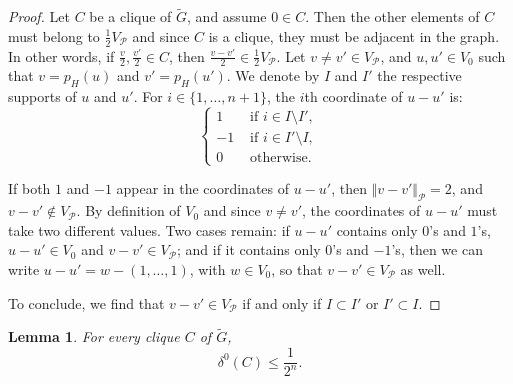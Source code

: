 \documentclass{amsart}                     %
\newtheorem{lemm}{Lemma}
\begin{document}
\begin{proof}
Let $C$ be a clique of $\tilde{G}$, and assume $0\in C$. Then the other elements of $C$ must belong to $\frac{1}{2}V_\mathcal{P}$ and since $C$ is a clique, they must be adjacent in the graph. In other words, if $\frac{v}{2},\frac{v'}{2}\in C$, then $\frac{v-v'}{2}\in \frac{1}{2}V_\mathcal{P}$. Let $v\neq v'\in V_\mathcal{P}$, and $u,u'\in V_0$ such that $v=p_H(u)$ and $v'=p_H(u')$. We denote by $I$ and $I'$ the respective supports of $u$ and $u'$. For $i\in\{1,\ldots,n+1\}$, the $i$th coordinate of $u-u'$ is:
$$\begin{cases} 
 1 & \text{ if } i\in I\setminus I', \\
 -1 & \text{ if } i\in I'\setminus I, \\
 0 & \text{ otherwise. } 
 \end{cases}$$

If both $1$ and $-1$ appear in the coordinates of $u-u'$, then $\Vert  v-v'\Vert  _\mathcal{P}=2$, and $v-v'\notin V_\mathcal{P}$.  By definition of $V_0$ and since $v\neq v'$, the coordinates of $u-u'$ must take two 
different values. Two cases remain: if $u-u'$ contains only $0$'s and $1$'s, $u-u'\in V_0$ and $v-v'\in V_\mathcal{P}$; and if it contains only $0$'s and $-1$'s, then we can write $u-u'=w-(1,\ldots,1)$, with $w\in V_0$, so that $v-v'\in V_\mathcal{P}$ as well.

To conclude, we find that $v-v'\in V_\mathcal{P}$ if and only if $I\subset I'$ or $I'\subset I$. 

\end{proof}

\begin{lemm}\label{AnDelta*}
For every  clique $C$ of $\tilde{G}$,
$$\delta^0(C)\leq\frac{1}{2^n}.$$
\end{lemm}
\end{document}

